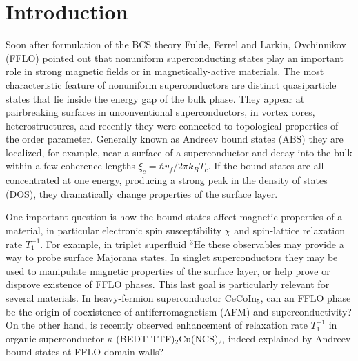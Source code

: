 \documentclass[prb,aps,showpacs,amsmath,twocolumn,10pt]{revtex4-1}
\newcommand{\cecoin}{CeCoIn$_5$}
\newcommand{\kbtf}{$\kappa$-(BEDT-TTF)$_2$Cu(NCS)$_2$}
\begin{document}
\section{Introduction}
\label{sec:intro}
%

Soon after formulation of the BCS theory\cite{BCS}
Fulde, Ferrel\cite{PhysRev.135.A550} and Larkin, Ovchinnikov\cite{larkin1965inhomogeneous} (FFLO)
pointed out that nonuniform superconducting states play an important role 
in strong magnetic fields or in magnetically-active materials. 
The most characteristic feature of nonuniform superconductors are distinct quasiparticle states 
that lie inside the energy gap of the bulk phase. 
They appear at pairbreaking surfaces in unconventional superconductors,\cite{CHu1994} 
in vortex cores,\cite{CAROLI1964307} 
heterostructures,\cite{MEschrig2015}
and recently they were connected to topological properties of the order parameter.\cite{Tanaka2012,Mizushima2016}
Generally known as Andreev bound states (ABS) they are localized, for example, near 
a surface of a superconductor and decay into the bulk 
within a few coherence lengths $\xi_{c} = \hbar v_f/2\pi k_B T_c$.
If the bound states are all concentrated at one energy, 
producing a strong peak in the density of states (DOS), they dramatically change properties 
of the surface layer. 

One important question is how the bound states affect magnetic properties of a material, in particular 
electronic spin susceptibility $\chi$ and spin-lattice relaxation rate $T_1^{-1}$. 
For example, in triplet superfluid $^3$He these observables may provide a way to probe 
surface Majorana states.\cite{Nagato:2009chi,Chung:2009t1}
In singlet superconductors they may be used to manipulate magnetic properties of 
the surface layer, or help prove or disprove existence of FFLO phases. 
This last goal is particularly relevant for several materials. 
In heavy-fermion superconductor \cecoin, can an FFLO phase be the origin of 
coexistence\cite{cecoin5_Kenzelmann,cecoin5_Kenzelmann2,Gerber2014} of antiferromagnetism (AFM) and superconductivity?
On the other hand, is recently observed\cite{Mayaffre2014} enhancement of relaxation rate $T_1^{-1}$ 
in organic superconductor \kbtf, indeed explained by Andreev bound states at FFLO domain walls?  
\end{document}

